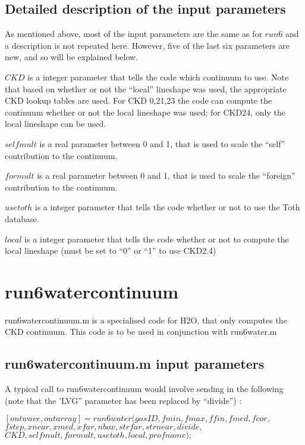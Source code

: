 \documentclass[11pt]{article}
\begin{document}
\subsection{Detailed description of the input parameters}

As mentioned above, most of the input parameters are the same as for $run6$
and a description is not repeated here. However, five of the last six 
parameters are new, and so will be explained below.

$CKD$ is a integer parameter that tells the code which continuum to use. 
Note that based on whether or not the ``local'' lineshape was used, the 
appropriate CKD lookup tables are used. For CKD 0,21,23 the code can 
compute the continuum whether or not the local lineshape was used; for 
CKD24, only the local lineshape can be used.

$selfmult$ is a real parameter between 0 and 1, that is used to scale the
``self'' contribution to the continuum.

$formult$ is a real parameter between 0 and 1, that is used to scale the
``foreign'' contribution to the continuum.

$usetoth$ is a integer parameter that tells the code whether or not to use 
the Toth database.

$local$ is a integer parameter that tells the code whether or not to compute
the local lineshape (must be set to ``0'' or ``1'' to use CKD2.4)

\section{run6watercontinuum}

run6watercontinuum.m is a specialised code for H2O, that only computes the
CKD continuum. This code is to be used in conjunction with run6water.m

\subsection{run6watercontinuum.m input parameters}

A typical call to run6watercontinuum would involve sending in the following 
(note that the 'LVG'' parameter has been replaced by ``divide'') : 

$[outwave,outarray]=run6water(gasID,fmin,fmax,ffin,fmed,fcor,$\\
              $fstep,xnear,xmed,xfar,nbox,strfar,strnear,divide,$\\
              $CKD,selfmult,formult,usetoth,local,profname);$
\end{document}
